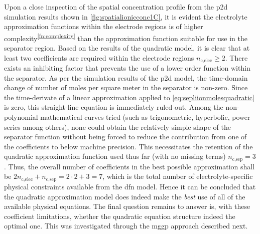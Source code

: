 Upon a close inspection of the  spatial concentration profile from the \gls{p2d}
simulation  results shown  in \cref{fig:spatialionicconc1C}, it  is evident  the
electrolyte approximation  functions within the  electrode regions is  of higher
complexity\textsuperscript{\ref{fn:complexity}} than  the approximation function
suitable  for  use  in  the  separator  region. Based  on  the  results  of  the
quadratic  model, it  is  clear  that at  least  two  coefficients are  required
within the  electrode regions \ie{}  $n_{\text{c,elec}} \ge 2$. There  exists an
inhibiting  factor that  prevents  the  use of  a  lower  order function  within
the  separator. As  per  the  simulation results  of  the  \gls{p2d} model,  the
time-domain  change  of number  of  moles  per  square  meter in  the  separator
is  non-zero.  Since  the  time-derivate   of  a  linear  approximation  applied
to \cref{eq:sepliionmolesquadratic}  is  zero,  this straight-line  equation  is
immediately ruled out. Among the  non-polynomial mathematical curves tried (such
as trigonometric, hyperbolic, power series  among others), none could obtain the
relatively simple shape of the separator function without being forced to reduce
the  contribution from  one  of  the coefficients  to  below machine  precision.
This necessitates  the retention  of the  quadratic approximation  function used
thus  far  (with  no  missing  terms) \ie{}  $n_\text{c,sep}  =  3$.  Thus,  the
overall number  of coefficients in the  best possible approximation shall  be $2
n_\text{c,elec} + n_\text{c,sep} =  2\cdot2 + 3 = 7$, which  is the total number
of electrolyte-specific physical constraints available from the \gls{dfn} model.
Hence it  can be concluded  that the  quadratic approximation model  does indeed
make the \emph{best}  use of all of the available  physical equations. The final
question remains to  answer is, with these coefficient  limitations, whether the
quadratic  equation structure  indeed  the optimal  one.  This was  investigated
through the \gls{mggp} approach described next.

